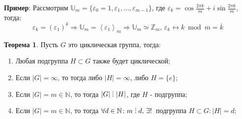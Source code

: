\documentclass[12pt]{article}
\newcommand{\MN}{\mathbb{N}}
\newcommand{\MZ}{\mathbb{Z}}
\newcommand{\VE}{\varepsilon}
\theoremstyle{definition}
\newtheorem{theorem}{Теорема}
\DeclareRobustCommand{\divby}{%
	\mathrel{\text{\vbox{\baselineskip.65ex\lineskiplimit0pt\hbox{.}\hbox{.}\hbox{.}}}}%
}
\newcommand{\linsp}[1]{\left\langle #1 \right\rangle }
\newcommand{\ovl}[1]{\overline{#1}}
\begin{document}
\textbf{Пример}: Рассмотрим $\mathbb{U}_m = \{\VE_0 = 1,\VE_1, \dotsc, \VE_{m-1}\}$, где $\VE_k = \cos\tfrac{2\pi k}{m} + i\sin\tfrac{2\pi k}{m}$, тогда:
$$
	\VE_k = (\VE_1)^k \Rightarrow \mathbb{U}_m = \linsp{\VE_1}_m \Rightarrow \mathbb{U}_m \simeq \MZ_m, \, \VE_k \leftrightarrow k\bmod m = \ovl{k}
$$

\begin{theorem}
	Пусть $G$ это циклическая группа, тогда:
	\begin{enumerate}[label=\arabic*)]
		\item Любая подгруппа $H\subset G$ также будет циклической;
		\item Если $|G| = \infty$, то тогда либо $|H| = \infty$, либо $H =\{e\}$;
		\item Если $|G| = m \in \MN$, то тогда $|G| \divby |H|$, где $H$ - подгруппа; 
		\item Если $|G| = m \in \MN$, то тогда $\forall d \in \MN \colon m \divby d, \, \exists!\,$ подгруппа $H \subset G \colon |H| = d$;
	\end{enumerate}
\end{theorem}
\end{document}
